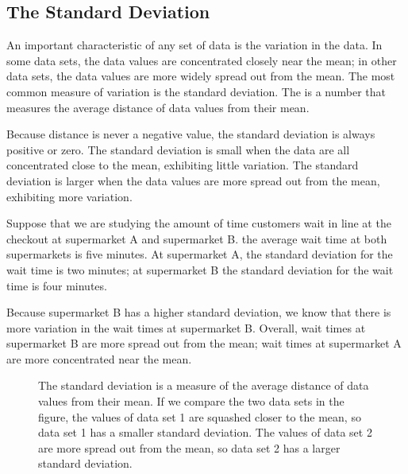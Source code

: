 \documentclass[letterpaper,10pt,english]{jupyterBook}
\begin{document}
\subsection{The Standard Deviation}
\label{\detokenize{Ch2 Descriptive Statistics/2.3 Measures of Dispersion:the-standard-deviation}}
\sphinxAtStartPar
An important characteristic of any set of data is the variation in the data. In some data sets, the data values are concentrated closely near the mean; in other data sets, the data values are more widely spread out from the mean. The most common measure of variation is the standard deviation. The  is a number that measures the average distance of data values from their mean.

\sphinxAtStartPar
Because distance is never a negative value, the standard deviation is always positive or zero. The standard deviation is small when the data are all concentrated close to the mean, exhibiting little variation. The standard deviation is larger when the data values are more spread out from the mean, exhibiting more variation.

\sphinxAtStartPar
Suppose that we are studying the amount of time customers wait in line at the checkout at supermarket A and supermarket B. the average wait time at both supermarkets is five minutes. At supermarket A, the standard deviation for the wait time is two minutes; at supermarket B the standard deviation for the wait time is four minutes.

\sphinxAtStartPar
Because supermarket B has a higher standard deviation, we know that there is more variation in the wait times at supermarket B. Overall, wait times at supermarket B are more spread out from the mean; wait times at supermarket A are more concentrated near the mean.

\begin{figure}[htbp]
\centering
\capstart

\noindent{}
\caption{The standard deviation is a measure of the average distance of data values from their mean. If we compare the two data sets in the figure, the values of data set 1 are squashed closer to the mean, so data set 1 has a smaller standard deviation. The values of data set 2 are more spread out from the mean, so data set 2 has a larger standard deviation.}\label{\detokenize{Ch2 Descriptive Statistics/2.3 Measures of Dispersion:sd-example}}\end{figure}
\end{document}
